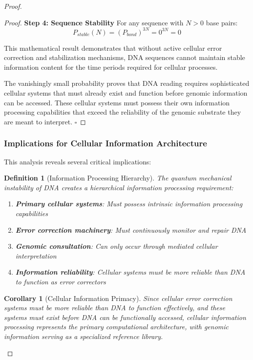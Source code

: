 \documentclass[12pt,a4paper]{article}
\newtheorem{definition}[theorem]{Definition}
\newtheorem{corollary}[theorem]{Corollary}
\begin{document}
\begin{proof}
\begin{proof}
\textbf{Step 4: Sequence Stability}
For any sequence with $N > 0$ base pairs:
\begin{equation}
P_{stable}(N) = (P_{bond})^{3N} = 0^{3N} = 0
\end{equation}

This mathematical result demonstrates that without active cellular error correction and stabilization mechanisms, DNA sequences cannot maintain stable information content for the time periods required for cellular processes.

The vanishingly small probability proves that DNA reading requires sophisticated cellular systems that must already exist and function before genomic information can be accessed. These cellular systems must possess their own information processing capabilities that exceed the reliability of the genomic substrate they are meant to interpret. $\square$
\end{proof}

\subsubsection{Implications for Cellular Information Architecture}

This analysis reveals several critical implications:

\begin{definition}[Information Processing Hierarchy]
The quantum mechanical instability of DNA creates a hierarchical information processing requirement:
\begin{enumerate}
\item \textbf{Primary cellular systems}: Must possess intrinsic information processing capabilities
\item \textbf{Error correction machinery}: Must continuously monitor and repair DNA
\item \textbf{Genomic consultation}: Can only occur through mediated cellular interpretation
\item \textbf{Information reliability}: Cellular systems must be more reliable than DNA to function as error correctors
\end{enumerate}
\end{definition}

\begin{corollary}[Cellular Information Primacy]
Since cellular error correction systems must be more reliable than DNA to function effectively, and these systems must exist before DNA can be functionally accessed, cellular information processing represents the primary computational architecture, with genomic information serving as a specialized reference library.
\end{corollary}


\end{proof}
\end{document}
